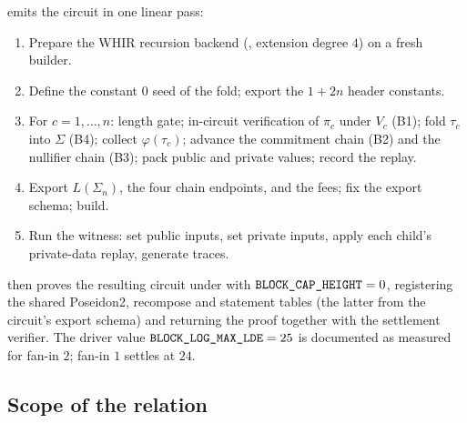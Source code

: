  emits the circuit in one linear pass:
\begin{enumerate}
\item Prepare the WHIR recursion backend (,
  extension degree $4$) on a fresh builder.
\item Define the constant $0$ seed of the fold; export the $1+2n$ header
  constants. 
\item For $c=1,\dots,n$: length gate; in-circuit verification of $\pi_c$ under
  $V_c$ (B1); fold $\tau_c$ into $\Sigma$ (B4); collect $\varphi(\tau_c)$; advance
  the commitment chain (B2) and the nullifier chain (B3); pack public and private
  values; record the replay.
\item Export $L(\Sigma_n)$, the four chain endpoints, and the fees; fix the export
  schema; build. 
\item Run the witness: set public inputs, set private inputs, apply each child's
  private-data replay, generate traces.
\end{enumerate}
 then proves the resulting circuit under
 with
$\texttt{BLOCK\_CAP\_HEIGHT}=0$, registering the shared Poseidon2, recompose and
statement tables (the latter from the circuit's export schema) and returning the
proof together with the settlement verifier.
The driver value $\texttt{BLOCK\_LOG\_MAX\_LDE}=25$ is documented as measured for
fan-in $2$; fan-in $1$ settles at $24$.

\subsection{Scope of the relation}

